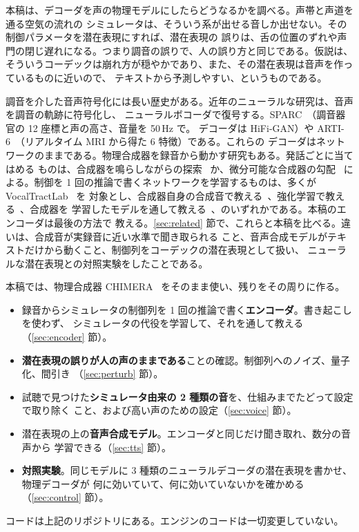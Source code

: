 \documentclass[10pt,a4paper,twocolumn]{article}
\begin{document}
本稿は、デコーダを声の物理モデルにしたらどうなるかを調べる。声帯と声道を通る空気の流れの
シミュレータは、そういう系が出せる音しか出せない。その制御パラメータを潜在表現にすれば、潜在表現の
誤りは、舌の位置のずれや声門の閉じ遅れになる。つまり調音の誤りで、人の誤り方と同じである。仮説は、
そういうコーデックは崩れ方が穏やかであり、また、その潜在表現は音声を作っているものに近いので、
テキストから予測しやすい、というものである。

調音を介した音声符号化には長い歴史がある。近年のニューラルな研究は、音声を調音の軌跡に符号化し、
ニューラルボコーダで復号する。SPARC~\cite{sparc}（調音器官の 12 座標と声の高さ、音量を 50\,Hz で。
デコーダは HiFi-GAN）や ARTI-6~\cite{arti6}（リアルタイム MRI から得た 6 特徴）である。これらの
デコーダはネットワークのままである。物理合成器を録音から動かす研究もある。発話ごとに当てはめる
ものは、合成器を鳴らしながらの探索~\cite{promon} か、微分可能な合成器の勾配~\cite{sudholt,difftlm}
による。制御を 1 回の推論で書くネットワークを学習するものは、多くが VocalTractLab~\cite{vtl} を
対象とし、合成器自身の合成音で教える~\cite{gao,sun}、強化学習で教える~\cite{shibata}、合成器を
学習したモデルを通して教える~\cite{krug}、のいずれかである。本稿のエンコーダは最後の方法で
教える。\ref{sec:related} 節で、これらと本稿を比べる。違いは、合成音が実録音に近い水準で聞き取られる
こと、音声合成モデルがテキストだけから動くこと、制御列をコーデックの潜在表現として扱い、
ニューラルな潜在表現との対照実験をしたことである。

本稿では、物理合成器 CHIMERA~\cite{chimera} をそのまま使い、残りをその周りに作る。
\begin{itemize}
\item 録音からシミュレータの制御列を 1 回の推論で書く\textbf{エンコーダ}。書き起こしを使わず、
シミュレータの代役を学習して、それを通して教える（\ref{sec:encoder} 節）。
\item \textbf{潜在表現の誤りが人の声のままである}ことの確認。制御列へのノイズ、量子化、間引き
（\ref{sec:perturb} 節）。
\item 試聴で見つけた\textbf{シミュレータ由来の 2 種類の音}を、仕組みまでたどって設定で取り除く
こと、および高い声のための設定（\ref{sec:voice} 節）。
\item 潜在表現の上の\textbf{音声合成モデル}。エンコーダと同じだけ聞き取れ、数分の音声から
学習できる（\ref{sec:tts} 節）。
\item \textbf{対照実験}。同じモデルに 3 種類のニューラルデコーダの潜在表現を書かせ、物理デコーダが
何に効いていて、何に効いていないかを確かめる（\ref{sec:control} 節）。
\end{itemize}
コードは上記のリポジトリにある。エンジンのコードは一切変更していない。
\end{document}
